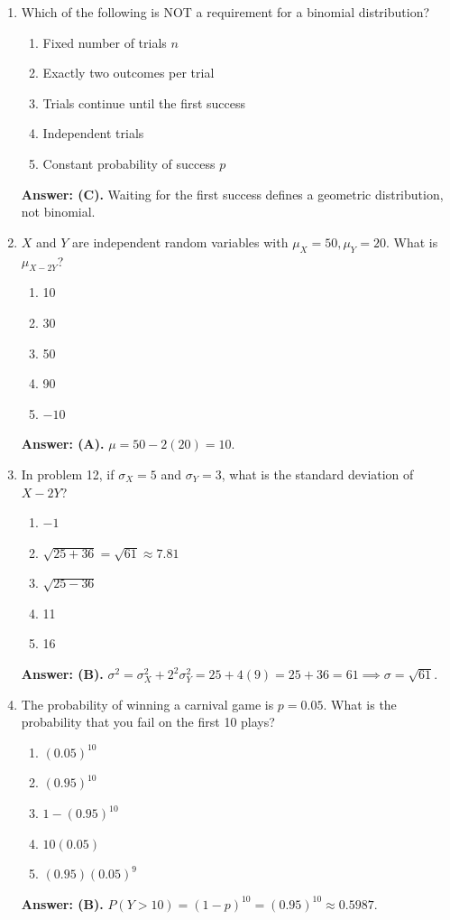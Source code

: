 \begin{enumerate}[resume, leftmargin=1.5em]
  \item Which of the following is NOT a requirement for a binomial distribution?
  \begin{enumerate}[label=(\Alph*)]
    \item Fixed number of trials $n$ \item Exactly two outcomes per trial \item Trials continue until the first success \item Independent trials \item Constant probability of success $p$
  \end{enumerate}
  \textbf{Answer: (C).} Waiting for the first success defines a geometric distribution, not binomial.

  \item $X$ and $Y$ are independent random variables with $\mu_X = 50, \mu_Y = 20$. What is $\mu_{X - 2Y}$?
  \begin{enumerate}[label=(\Alph*)]
    \item 10 \item 30 \item 50 \item 90 \item $-10$
  \end{enumerate}
  \textbf{Answer: (A).} $\mu = 50 - 2(20) = 10$.

  \item In problem 12, if $\sigma_X = 5$ and $\sigma_Y = 3$, what is the standard deviation of $X - 2Y$?
  \begin{enumerate}[label=(\Alph*)]
    \item $-1$ \item $\sqrt{25 + 36} = \sqrt{61} \approx 7.81$ \item $\sqrt{25 - 36}$ \item 11 \item 16
  \end{enumerate}
  \textbf{Answer: (B).} $\sigma^2 = \sigma_X^2 + 2^2 \sigma_Y^2 = 25 + 4(9) = 25 + 36 = 61 \implies \sigma = \sqrt{61}$.

  \item The probability of winning a carnival game is $p = 0.05$. What is the probability that you fail on the first 10 plays?
  \begin{enumerate}[label=(\Alph*)]
    \item $(0.05)^{10}$ \item $(0.95)^{10}$ \item $1 - (0.95)^{10}$ \item $10(0.05)$ \item $(0.95)(0.05)^9$
  \end{enumerate}
  \textbf{Answer: (B).} $P(Y > 10) = (1 - p)^{10} = (0.95)^{10} \approx 0.5987$.


\end{enumerate}
